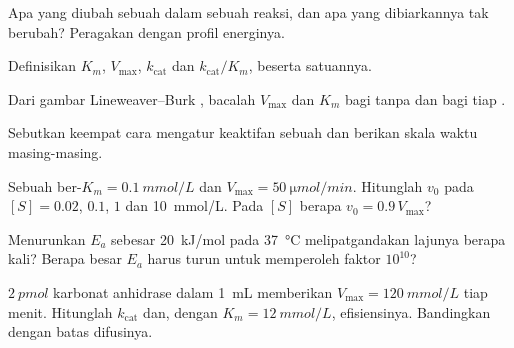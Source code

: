 \begin{exercise}[$\star$]\label{exo:b1:enzymes:1}
Apa yang diubah sebuah  dalam sebuah reaksi, dan apa yang
dibiarkannya tak berubah? Peragakan dengan profil energinya.
\end{exercise}

\begin{exercise}[$\star$]\label{exo:b1:enzymes:2}
Definisikan $K_m$, $V_{\max}$, $k_{\text{cat}}$ dan
$k_{\text{cat}}/K_m$, beserta satuannya.
\end{exercise}

\begin{exercise}[$\star$]\label{exo:b1:enzymes:3}
Dari gambar Lineweaver--Burk , bacalah $V_{\max}$ dan
$K_m$ bagi  tanpa  dan bagi tiap .
\end{exercise}

\begin{exercise}[$\star$]\label{exo:b1:enzymes:4}
Sebutkan keempat cara  mengatur keaktifan sebuah  dan berikan
skala waktu masing-masing.
\end{exercise}

\begin{exercise}[$\star\star$]\label{exo:b1:enzymes:5}
Sebuah  ber-$K_m = \qty{0.1}{mmol/L}$ dan $V_{\max} =
\qty{50}{\micro mol/min}$. Hitunglah $v_0$ pada $[S] = 0.02$, $0.1$,
$1$ dan \qty{10}{mmol/L}. Pada $[S]$ berapa $v_0 = 0.9\,V_{\max}$?
\end{exercise}

\begin{exercise}[$\star\star$]\label{exo:b1:enzymes:6}
Menurunkan $E_a$ sebesar \qty{20}{kJ/mol} pada \qty{37}{\celsius}
melipatgandakan lajunya berapa kali? Berapa besar $E_a$ harus turun
untuk memperoleh faktor
$10^{10}$?
\end{exercise}

\begin{exercise}[$\star\star$]\label{exo:b1:enzymes:7}
$\qty{2}{pmol}$ karbonat anhidrase dalam \qty{1}{mL} memberikan
$V_{\max} = \qty{120}{mmol/L}$ tiap menit. Hitunglah $k_{\text{cat}}$
dan, dengan $K_m = \qty{12}{mmol/L}$, efisiensinya. Bandingkan dengan
batas difusinya.
\end{exercise}

